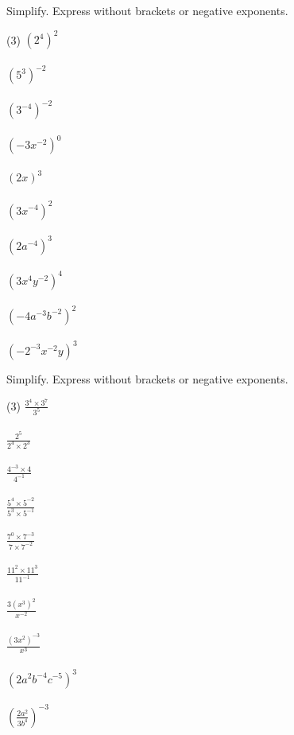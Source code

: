\documentclass[12pt,fleqn]{book}
\newcommand{\prb}[1]{\begin{Exercise}#1\end{Exercise}}
\begin{document}
\prb{Simplify. Express without brackets or negative exponents.\\
    \begin{tasks}(3)
\task $\left(2^{4}\right)^{2}$\\
\\[1in]
\task $\left(5^{3}\right)^{-2}$\\
\\[1in]
\task $\left(3^{-4}\right)^{-2}$\\
\\[1in]
\task $\left(-3 x^{-2}\right)^{0}$\\
\\[1in]
\task $(2 x)^{3}$\\
\\[1in]
\task $\left(3 x^{-4}\right)^{2}$\\
\\[1in]
\task $\left(2 a^{-4}\right)^{3}$\\
\\[1in]
\task $\left(3 x^{4} y^{-2}\right)^{4}$\\
\\[1in]
\task $\left(-4 a^{-3} b^{-2}\right)^{2}$\\
\\[1in]
\task $\left(-2^{-3} x^{-2} y\right)^{3}$
\\[1in]
\end{tasks}
}
    \prb{
Simplify. Express without brackets or negative exponents.\\
\begin{tasks}(3)
\task $\displaystyle \frac{3^{4} \times 3^{7}}{3^{5}}$\\
\\[1in]
\task $\displaystyle \frac{2^{5}}{2^{4} \times 2^{3}}$\\
\\[1in]
\task $\displaystyle \frac{4^{-3} \times 4}{4^{-1}}$\\
\\[1in]
\task $\displaystyle \frac{5^{4} \times 5^{-2}}{5^{3} \times 5^{-1}}$\\
\\[1in]
\task $\displaystyle \frac{7^{0} \times 7^{-3}}{7 \times 7^{-2}}$\\
\\[1in]
\task $\displaystyle \frac{11^{2} \times 11^{3}}{11^{-1}}$\\
\\[1in]
\task $\displaystyle \frac{3\left(x^{3}\right)^{2}}{x^{-2}}$\\
\\[1in]
\task $\displaystyle \frac{\left(3 x^{2}\right)^{-3}}{x^{3}}$\\
\\[1in]
\task $\displaystyle \left(2 a^{2} b^{-4} c^{-5}\right)^{3}$\\
\\[1in]
\task $\displaystyle \left(\frac{2 a^{2}}{3 b^{4}}\right)^{-3}$
\\[1in]
\end{tasks}
}
\end{document}
